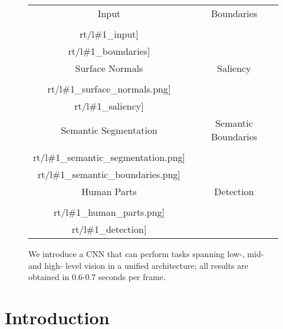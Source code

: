 \documentclass[10pt,twocolumn,letterpaper]{article}
\begin{document}
\newcommand{\ft}[1]{#1}
\newcommand{\resfigwdf}[1]{
	{ \setlength{\tabcolsep}{.05em}	
		\begin{tabular}{cccc}
			\ft{Input} & \ft{Normals} & \ft{Normals} & \ft{Normals}\\
			\texttt{[image: \\rt/l\#1\_detection]}&
			\texttt{[image: \\rt/l\#1\_boundaries]}&	
			\texttt{[image: \\rt/l\#1\_surface\_normals]}&
			\texttt{[image: \\rt/l\#1\_saliency]}\\
			\texttt{[image: \\rt/l\#1\_detection]}&
			\texttt{[image: \\rt/l\#1\_semantic\_bounaries]}& 
			\texttt{[image: \\rt/\#1\_semantic\_segmentation]}& 
			\texttt{[image: \\rt/\#1\_human\_parts]}
		\end{tabular}
	}
}
\newcommand{\resfigwdt}[1]{
	{\setlength{\tabcolsep}{.2em}	
		\begin{tabular}{cc}
			\ft{Input} & \ft{Boundaries} \\
			\texttt{[image: \\rt/l\#1\_input]}&
			\texttt{[image: \\rt/l\#1\_boundaries]}\\
			 \ft{Surface Normals} & \ft{Saliency}\\	
			\texttt{[image: \\rt/l\#1\_surface\_normals.png]}&
			\texttt{[image: \\rt/l\#1\_saliency]}\\
			 \ft{Semantic Segmentation} & \ft{Semantic Boundaries}\\
			\texttt{[image: \\rt/l\#1\_semantic\_segmentation.png]}&  
			\texttt{[image: \\rt/l\#1\_semantic\_boundaries.png]}\\
			 \ft{Human Parts} &  \ft{Detection} \\
			\texttt{[image: \\rt/l\#1\_human\_parts.png]} & 
			\texttt{[image: \\rt/l\#1\_detection]}
		\end{tabular}
	}
}
\begin{figure}
\resfigwdt{2}	
\caption{We introduce a CNN that can perform tasks spanning low-, mid- and high- level vision in a unified architecture; all results  are obtained in 0.6-0.7 seconds per frame.}
\end{figure}

\section{Introduction}

 
 
\end{document}
